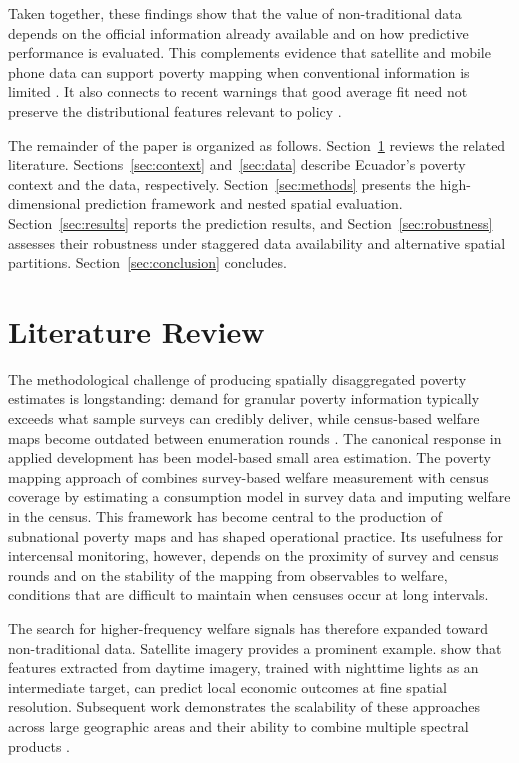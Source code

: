 \documentclass[pdflatex,sn-apa]{sn-jnl}
\begin{document}
Taken together, these findings show that the value of non-traditional data depends on the official information already available and on how predictive performance is evaluated. This complements evidence that satellite and mobile phone data can support poverty mapping when conventional information is limited \citep{jean2016combining, yeh2020using, blumenstock2015predicting, steele2017mapping, aiken2022machine}. It also connects to recent warnings that good average fit need not preserve the distributional features relevant to policy \citep{Corral2025, CorralRodas2025Aggregation}.

The remainder of the paper is organized as follows. Section~\ref{sec:literature} reviews the related literature. Sections~\ref{sec:context} and~\ref{sec:data} describe Ecuador's poverty context and the data, respectively. Section~\ref{sec:methods} presents the high-dimensional prediction framework and nested spatial evaluation. Section~\ref{sec:results} reports the prediction results, and Section~\ref{sec:robustness} assesses their robustness under staggered data availability and alternative spatial partitions. Section~\ref{sec:conclusion} concludes.

\section{Literature Review}
\label{sec:literature}

The methodological challenge of producing spatially disaggregated poverty estimates is longstanding: demand for granular poverty information typically exceeds what sample surveys can credibly deliver, while census-based welfare maps become outdated between enumeration rounds \citep{Corral2022SAE, Rao2015}. The canonical response in applied development has been model-based small area estimation. The poverty mapping approach of \citet{elbers2003micro} combines survey-based welfare measurement with census coverage by estimating a consumption model in survey data and imputing welfare in the census. This framework has become central to the production of subnational poverty maps and has shaped operational practice. Its usefulness for intercensal monitoring, however, depends on the proximity of survey and census rounds and on the stability of the mapping from observables to welfare, conditions that are difficult to maintain when censuses occur at long intervals.

The search for higher-frequency welfare signals has therefore expanded toward non-traditional data. Satellite imagery provides a prominent example. \citet{jean2016combining} show that features extracted from daytime imagery, trained with nighttime lights as an intermediate target, can predict local economic outcomes at fine spatial resolution. Subsequent work demonstrates the scalability of these approaches across large geographic areas and their ability to combine multiple spectral products \citep{yeh2020using}.
\end{document}
